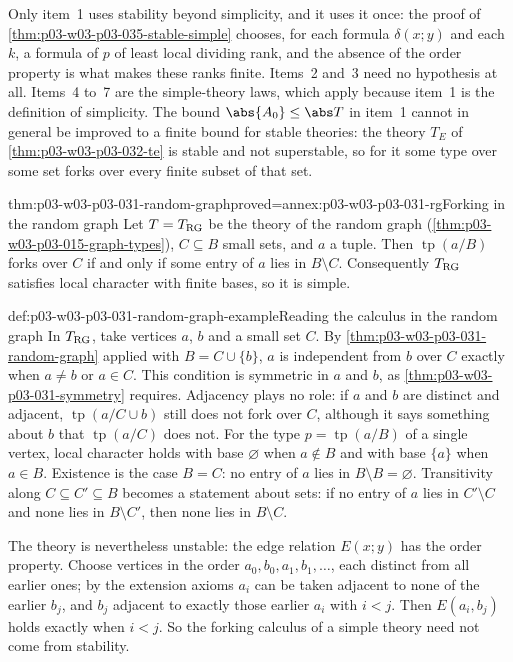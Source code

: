 Only item~1 uses stability beyond simplicity, and it uses it once: the
proof of \cref{thm:p03-w03-p03-035-stable-simple} chooses, for each
formula \(\delta(x;y)\) and each \(k\), a formula of \(p\) of least local
dividing rank, and the absence of the order property is what makes these
ranks finite.  Items~2 and~3 need no hypothesis at all.  Items~4 to~7 are
the simple-theory laws, which apply because item~1 is the definition of
simplicity.  The bound \(\abs{A_0}\leq\abs T\) in item~1 cannot in general
be improved to a finite bound for stable theories: the theory \(T_E\) of
\cref{thm:p03-w03-p03-032-te} is stable and not superstable, so for it
some type over some set forks over every finite subset of that set.

\begin{hbtheorem}{thm:p03-w03-p03-031-random-graph}{proved=annex:p03-w03-p03-031-rg}{Forking in the random graph}
Let \(T=T_{\rm RG}\) be the theory of the random graph
(\cref{thm:p03-w03-p03-015-graph-types}), \(C\subseteq B\) small sets, and
\(a\) a tuple.  Then \(\operatorname{tp}(a/B)\) forks over \(C\) if and
only if some entry of \(a\) lies in \(B\setminus C\).  Consequently
\(T_{\rm RG}\) satisfies local character with finite bases, so it is
simple.
\end{hbtheorem}

\begin{hbexample}{def:p03-w03-p03-031-random-graph-example}{Reading the calculus in the random graph}
In \(T_{\rm RG}\), take vertices \(a\), \(b\) and a small set \(C\).  By
\cref{thm:p03-w03-p03-031-random-graph} applied with \(B=C\cup\{b\}\),
\(a\) is independent from \(b\) over \(C\) exactly when \(a\neq b\) or
\(a\in C\).  This condition is symmetric in \(a\) and \(b\), as
\cref{thm:p03-w03-p03-031-symmetry} requires.  Adjacency plays no role:
if \(a\) and \(b\) are distinct and adjacent, \(\operatorname{tp}(a/C\cup
b)\) still does not fork over \(C\), although it says something about
\(b\) that \(\operatorname{tp}(a/C)\) does not.  For the type
\(p=\operatorname{tp}(a/B)\) of a single vertex, local character holds with
base \(\varnothing\) when \(a\notin B\) and with base \(\{a\}\) when
\(a\in B\).  Existence is the case \(B=C\): no entry of \(a\) lies in
\(B\setminus B=\varnothing\).  Transitivity along \(C\subseteq C'\subseteq
B\) becomes a statement about sets: if no entry of \(a\) lies in
\(C'\setminus C\) and none lies in \(B\setminus C'\), then none lies in
\(B\setminus C\).

The theory is nevertheless unstable: the edge relation \(E(x;y)\) has the
order property.  Choose vertices in the order
\(a_0,b_0,a_1,b_1,\ldots\), each distinct from all earlier ones; by the
extension axioms \(a_i\) can be taken adjacent to none of the earlier
\(b_j\), and \(b_j\) adjacent to exactly those earlier \(a_i\) with
\(i<j\).  Then \(E(a_i,b_j)\) holds exactly when \(i<j\).  So the
forking calculus of a simple theory need not come from stability.
\end{hbexample}

